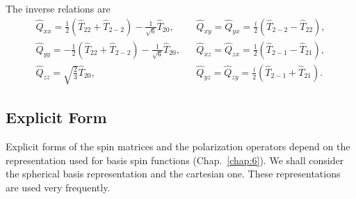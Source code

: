 The inverse relations are
\begin{equation}
\begin{aligned}
\hat{Q}_{x x}=\frac{1}{2}\left(\hat{T}_{22}+\hat{T}_{2-2}\right)-\frac{1}{\sqrt{6}} \hat{T}_{20}, && \hat{Q}_{x y}=\hat{Q}_{y x}=\frac{i}{2}\left(\hat{T}_{2-2}-\hat{T}_{22}\right), \\
\hat{Q}_{y y}=-\frac{1}{2}\left(\hat{T}_{22}+\hat{T}_{2-2}\right)-\frac{1}{\sqrt{6}} \hat{T}_{20}, && \hat{Q}_{x z}=\hat{Q}_{z x}=\frac{1}{2}\left(\hat{T}_{2-1}-\hat{T}_{21}\right),  \label{eq:2:6:8}\\
\hat{Q}_{z z}=\sqrt{\frac{2}{3}} \hat{T}_{20}, && \hat{Q}_{y z}=\hat{Q}_{z y}=\frac{i}{2}\left(\hat{T}_{2-1}+\hat{T}_{21}\right).
\end{aligned}
\end{equation}
\subsection{Explicit Form}\label{sec:2.6.2}
Explicit forms of the spin matrices and the polarization operators depend on the representation used for basis spin functions (Chap.~\ref{chap:6}). We shall consider the spherical basis representation and the cartesian one. These representations are used very frequently.

